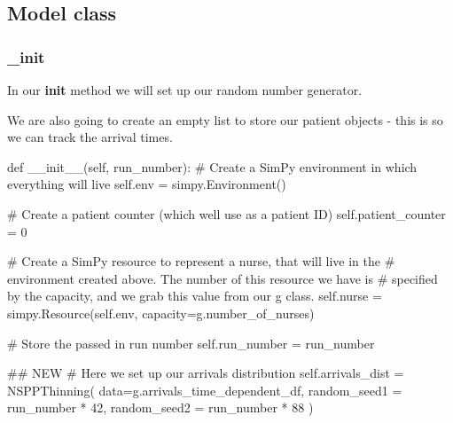 \documentclass[
  letterpaper,
  DIV=11,
  numbers=noendperiod]{scrreprt}
\newenvironment{Shaded}{\begin{snugshade}}{\end{snugshade}}
\newcommand{\CommentTok}[1]{\textcolor[rgb]{0.37,0.37,0.37}{#1}}
\newcommand{\DecValTok}[1]{\textcolor[rgb]{0.68,0.00,0.00}{#1}}
\newcommand{\FunctionTok}[1]{\textcolor[rgb]{0.28,0.35,0.67}{#1}}
\newcommand{\KeywordTok}[1]{\textcolor[rgb]{0.00,0.23,0.31}{#1}}
\newcommand{\NormalTok}[1]{\textcolor[rgb]{0.00,0.23,0.31}{#1}}
\newcommand{\OperatorTok}[1]{\textcolor[rgb]{0.37,0.37,0.37}{#1}}
\newcommand{\VariableTok}[1]{\textcolor[rgb]{0.07,0.07,0.07}{#1}}
\begin{document}
\subsection{Model class}\label{model-class-3}

\subsubsection{\_init}\label{init-1}

In our \textbf{init} method we will set up our random number generator.

We are also going to create an empty list to store our patient objects -
this is so we can track the arrival times.

\begin{Shaded}
\begin{Highlighting}[]
    \KeywordTok{def} \FunctionTok{\_\_init\_\_}\NormalTok{(}\VariableTok{self}\NormalTok{, run\_number):}
        \CommentTok{\# Create a SimPy environment in which everything will live}
        \VariableTok{self}\NormalTok{.env }\OperatorTok{=}\NormalTok{ simpy.Environment()}

        \CommentTok{\# Create a patient counter (which we\textquotesingle{}ll use as a patient ID)}
        \VariableTok{self}\NormalTok{.patient\_counter }\OperatorTok{=} \DecValTok{0}

        \CommentTok{\# Create a SimPy resource to represent a nurse, that will live in the}
        \CommentTok{\# environment created above.  The number of this resource we have is}
        \CommentTok{\# specified by the capacity, and we grab this value from our g class.}
        \VariableTok{self}\NormalTok{.nurse }\OperatorTok{=}\NormalTok{ simpy.Resource(}\VariableTok{self}\NormalTok{.env, capacity}\OperatorTok{=}\NormalTok{g.number\_of\_nurses)}

        \CommentTok{\# Store the passed in run number}
        \VariableTok{self}\NormalTok{.run\_number }\OperatorTok{=}\NormalTok{ run\_number}

        \CommentTok{\#\# NEW}
        \CommentTok{\# Here we set up our arrivals distribution}
        \VariableTok{self}\NormalTok{.arrivals\_dist }\OperatorTok{=}\NormalTok{ NSPPThinning(}
\NormalTok{          data}\OperatorTok{=}\NormalTok{g.arrivals\_time\_dependent\_df,}
\NormalTok{          random\_seed1 }\OperatorTok{=}\NormalTok{ run\_number }\OperatorTok{*} \DecValTok{42}\NormalTok{,}
\NormalTok{          random\_seed2 }\OperatorTok{=}\NormalTok{ run\_number }\OperatorTok{*} \DecValTok{88}
\NormalTok{        )}


\end{Highlighting}
\end{Shaded}
\end{document}
